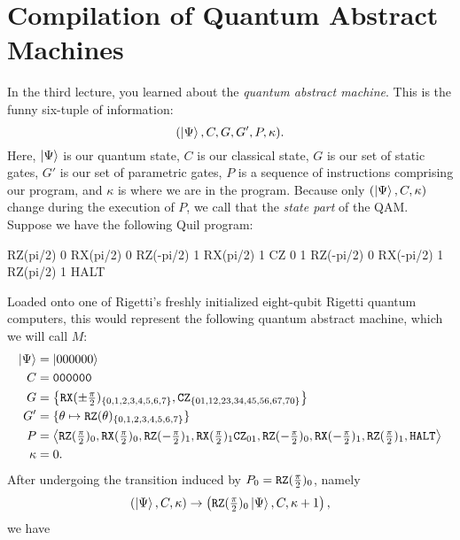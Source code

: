\section{Compilation of Quantum Abstract Machines}
In the third lecture, you learned about the \emph{quantum abstract machine}. This is the funny six-tuple of information:
\begin{displaymath}
(\ket{\Psi}, C, G, G', P, \kappa).
\end{displaymath}
Here, $\ket{\Psi}$ is our quantum state, $C$ is our classical state, $G$ is our set of static gates, $G'$ is our set of parametric gates, $P$ is a sequence of instructions comprising our program, and $\kappa$ is where we are in the program. Because only $(\ket{\Psi}, C, \kappa)$ change during the execution of $P$, we call that the \emph{state part} of the QAM. Suppose we have the following Quil program:
\begin{quil}
RZ(pi/2)  0
RX(pi/2)  0
RZ(-pi/2) 1
RX(pi/2)  1
CZ        0 1
RZ(-pi/2) 0
RX(-pi/2) 1
RZ(pi/2)  1
HALT
\end{quil}
Loaded onto one of Rigetti's freshly initialized eight-qubit Rigetti quantum computers, this would represent the following quantum abstract machine, which we will call $M$:
\begin{align*}
    \ket{\Psi} &= \ket{000000}\\
    C          &= \texttt{000000}\\
    G          &= \left\{\mathtt{RX}(\pm\tfrac\pi 2)_{\{0,1,2,3,4,5,6,7\}}, \mathtt{CZ}_{\{01,12,23,34,45,56,67,70\}}\right\}\\
    G'         &= \{\theta\mapsto\mathtt{RZ}(\theta)_{\{0,1,2,3,4,5,6,7\}}\}\\
    P          &= \left\langle
                    \mathtt{RZ}(\tfrac\pi 2)_0,
                    \mathtt{RX}(\tfrac\pi 2)_0,
                    \mathtt{RZ}(-\tfrac\pi 2)_1,
                    \mathtt{RX}(\tfrac\pi 2)_1
                    \mathtt{CZ}_{01},
                    \mathtt{RZ}(-\tfrac \pi 2)_0,
                    \mathtt{RX}(-\tfrac \pi 2)_1,
                    \mathtt{RZ}(\tfrac\pi 2)_1,
                    \mathtt{HALT}{}
                  \right\rangle\\
    \kappa     &= 0.
\end{align*}
After undergoing the transition induced by $P_0=\mathtt{RZ}(\tfrac\pi 2)_0$, namely
\begin{displaymath}
(\ket{\Psi}, C, \kappa) \to \left(\mathtt{RZ}(\tfrac\pi 2)_0\ket{\Psi}, C, \kappa+1\right),
\end{displaymath}
we have
